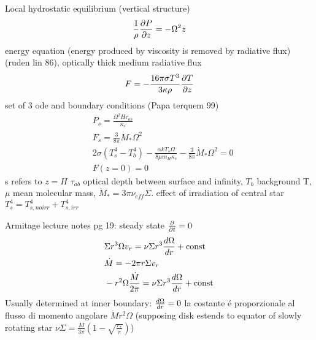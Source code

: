 \begin{workout}
	Local hydrostatic equilibrium (vertical structure)
	\begin{equation}
	\frac{1}{\rho}\PDy{z}{P}=-\Omega^2z
	\end{equation}
	energy equation (energy produced by viscosity is removed by radiative flux)(ruden lin 86), optically thick medium radiative flux
	\begin{equation}
	F=-\frac{16\pi\sigma T^3}{3\kappa\rho}\PDy{z}{T}
	\end{equation}
	set of 3 ode and boundary conditions (Papa terquem 99)
	\begin{align}
	&P_s=\frac{\Omega^2H\tau_{ab}}{\kappa_s}\\
	&F_s=\frac{3}{8\pi}\dot{M}_*\Omega^2\\
	&2\sigma(T_s^4-T_b^4)-\frac{\alpha kT_s\Omega}{8\mu m_H\kappa_s}-\frac{3}{8\pi}\dot{M}_*\Omega^2=0\\
	&F(z=0)=0
	\end{align}
	s refers to $z=H$ $\tau_{ab}$ optical depth between surface and infinity, $T_b$ background T, $\mu$ mean molecular mass, $\dot{M}_*=3\pi\nu_{eff}\Sigma$.
	effect of irradiation of central star $T_s^4=T_{s,noirr}^4+T_{s,irr}^4$
\end{workout}


\begin{workout}
	Armitage lecture notes pg 19: steady state $\PDof{t}=0$
	\begin{align*}
	&\Sigma r^3\Omega v_r=\nu\Sigma r^3\TDy{r}{\Omega}+\const{}\\
	&\dot{M}=-2\pi r\Sigma v_r\\
	&-r^2\Omega\frac{\dot{M}}{2\pi}=\nu\Sigma r^3\TDy{r}{\Omega}+\const{}
	\end{align*}
	Usually determined at inner boundary: $\TDy{r}{\Omega}=0$ la costante \'e proporzionale al flusso di momento angolare $\dot{M}r^2\Omega$ (supposing disk estends to equator of slowly rotating star $\nu\Sigma=\frac{\dot{M}}{3\pi}(1-\sqrt{\frac{r_*}{r}})$)
\end{workout}

